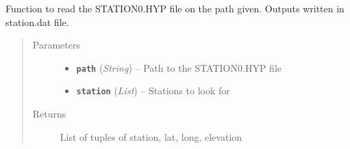 \documentclass[a4paper,10pt,english]{sphinxmanual}
\begin{document}

\begin{fulllineitems}
\label{utils:catalogue2DD.readSTATION0}
Function to read the STATION0.HYP file on the path given.  Outputs written
in station.dat file.
\begin{quote}\begin{description}
\item[{Parameters}] \leavevmode\begin{itemize}
\item {} 
\textbf{\texttt{path}} (\emph{String}) -- Path to the STATION0.HYP file

\item {} 
\textbf{\texttt{station}} (\emph{List}) -- Stations to look for

\end{itemize}

\item[{Returns}] \leavevmode
List of tuples of station, lat, long, elevation

\end{description}\end{quote}

\end{fulllineitems}

\end{document}
